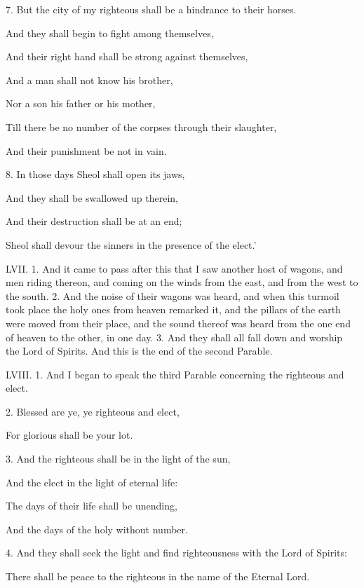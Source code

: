 7. But the city of my righteous shall be a hindrance to their horses.

And they shall begin to fight among themselves,

And their right hand shall be strong against themselves,

And a man shall not know his brother,

Nor a son his father or his mother,

Till there be no number of the corpses through their slaughter,

And their punishment be not in vain.

8. In those days Sheol shall open its jaws,

And they shall be swallowed up therein,

And their destruction shall be at an end;

Sheol shall devour the sinners in the presence of the elect.’


LVII. 1. And it came to pass after this that I saw
another host of wagons, and men riding thereon, and
coming on the winds from the east, and from the
west to the south. 2. And the noise of their wagons
was heard, and when this turmoil took place the holy
ones from heaven remarked it, and the pillars of the
earth were moved from their place, and the sound
thereof was heard from the one end of heaven to the
other, in one day. 3. And they shall all fall down and
worship the Lord of Spirits. And this is the end of
the second Parable.



LVIII. 1. And I began to speak the third Parable
concerning the righteous and elect.

2. Blessed are ye, ye righteous and elect,

For glorious shall be your lot.

3. And the righteous shall be in the light of the sun,

And the elect in the light of eternal life:

The days of their life shall be unending,

And the days of the holy without number.

4. And they shall seek the light and find righteousness with the Lord of Spirits:

There shall be peace to the righteous in the name of the Eternal Lord.

